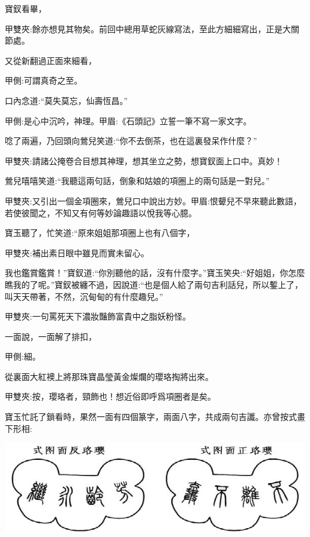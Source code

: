 \begin{parag}
    寶釵看畢，\begin{note}甲雙夾:餘亦想見其物矣。前回中總用草蛇灰線寫法，至此方細細寫出，正是大關節處。\end{note}又從新翻過正面來細看，\begin{note}甲側:可謂真奇之至。\end{note}口內念道:“莫失莫忘，仙壽恆昌。”\begin{note}甲側:是心中沉吟，神理。甲眉:《石頭記》立誓一筆不寫一家文字。\end{note}唸了兩遍，乃回頭向鶯兒笑道:“你不去倒茶，也在這裏發呆作什麼？”\begin{note}甲雙夾:請諸公掩卷合目想其神理，想其坐立之勢，想寶釵面上口中。真妙！\end{note}鶯兒嘻嘻笑道:“我聽這兩句話，倒象和姑娘的項圈上的兩句話是一對兒。”\begin{note}甲雙夾:又引出一個金項圈來，鶯兒口中說出方妙。甲眉:恨顰兒不早來聽此數語，若使彼聞之，不知又有何等妙論趣語以悅我等心臆。\end{note}寶玉聽了，忙笑道:“原來姐姐那項圈上也有八個字，\begin{note}甲雙夾:補出素日眼中雖見而實未留心。\end{note}我也鑑賞鑑賞！”寶釵道:“你別聽他的話，沒有什麼字。”寶玉笑央:“好姐姐，你怎麼瞧我的了呢。”寶釵被纏不過，因說道:“也是個人給了兩句吉利話兒，所以鏨上了，叫天天帶著，不然，沉甸甸的有什麼趣兒。”\begin{note}甲雙夾:一句罵死天下濃妝豔飾富貴中之脂妖粉怪。\end{note}一面說，一面解了排扣，\begin{note}甲側:細。\end{note}從裏面大紅襖上將那珠寶晶瑩黃金燦爛的瓔珞掏將出來。\begin{note}甲雙夾:按，瓔珞者，頸飾也！想近俗即呼爲項圈者是矣。\end{note}寶玉忙託了鎖看時，果然一面有四個篆字，兩面八字，共成兩句吉讖。亦曾按式畫下形相:
\end{parag}

\includegraphics[]{1-80/8-2}


